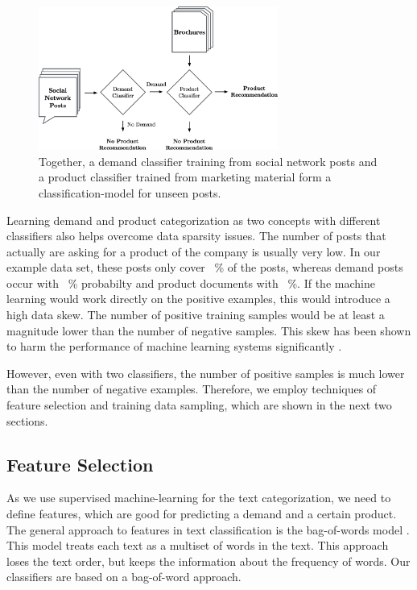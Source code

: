 \begin{figure}
	\label{fig:workflow}
	\begin{center}
		\includegraphics[width=0.7\textwidth]{figures/nto_workflow.eps}
	\end{center}
	\caption{Together, a demand classifier training from social network posts and a product classifier trained from marketing material form a classification-model for unseen posts.}
\end{figure}

Learning demand and product categorization as two concepts with different classifiers also helps overcome data sparsity issues.
The number of posts that actually are asking for a product of the company is usually very low.
In our example data set, these posts only cover ~\% of the posts, whereas demand posts occur with ~\% probabilty and product documents with ~\%.
If the machine learning would work directly on the positive examples, this would introduce a high data skew.
The number of positive training samples would be at least a magnitude lower than the number of negative samples.
This skew has been shown to harm the performance of machine learning systems significantly \cite{monard2002learning,guo2008class}.

However, even with two classifiers, the number of positive samples is much lower than the number of negative examples.
Therefore, we employ techniques of feature selection and training data sampling, which are shown in the next two sections.

\subsection{Feature Selection}
As we use supervised machine-learning for the text categorization, we need to define features, which are good for predicting a demand and a certain product.
The general approach to features in text classification is the bag-of-words model \cite{yang1997comparative,zhang2010understanding}.
This model treats each text as a multiset of words in the text.
This approach loses the text order, but keeps the information about the frequency of words.
Our classifiers are based on a bag-of-word approach.

